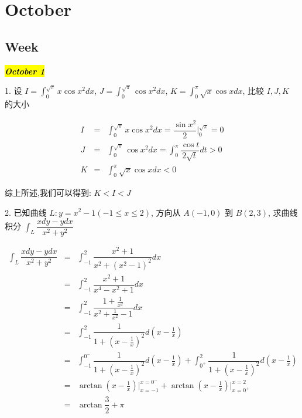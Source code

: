 \chapter{October}
\section{Week }
\hl{\textbf{\textit{October 1}}}

1. 设 $\displaystyle{I=\int_{0}^{\sqrt{\pi}}x\cos x^2dx}$,
$\displaystyle{J=\int_{0}^{\sqrt{\pi}}\cos x^2dx}$,
$\displaystyle{K=\int_{0}^{\pi}\sqrt{x}\cos xdx}$, 比较 $I,J,K$ 的大小
\begin{solution}

	\begin{eqnarray*}
		I & = & \int_{0}^{\sqrt{\pi}}x\cos x^2dx=\dfrac{\sin x^2}{2}|_{0}^{\sqrt{\pi}}=0 \\
		J & = & \int_{0}^{\sqrt{\pi}}\cos x^2dx=\int_{0}^{\pi}\dfrac{\cos t}{2\sqrt{t}}dt>0 \\
	    K & = & \int_{0}^{\pi}\sqrt{x}\cos xdx<0
	\end{eqnarray*}

	综上所述,我们可以得到: $ K < I < J$
\end{solution}

2. 已知曲线 $L: y=x^2-1(-1\leq x\leq 2)$, 方向从 $A(-1,0)$ 到 $B(2,3)$,
求曲线积分 $\displaystyle{\int_{L}\dfrac{xdy-ydx}{x^2+y^2}}$
\begin{solution}

	\begin{eqnarray*}
		\int_{L}\dfrac{xdy-ydx}{x^2+y^2}
		& = & \int_{-1}^{2}\dfrac{x^2+1}{x^2+(x^2-1)^2}dx\\
		& = & \int_{-1}^{2}\dfrac{x^2+1}{x^4-x^2+1}dx\\
		& = & \int_{-1}^{2}\dfrac{1+\frac{1}{x^2}}{x^2+\frac{1}{x^2}-1}dx\\
		& = & \int_{-1}^{2}\dfrac{1}{1+(x-\frac{1}{x})^2}d(x-\frac{1}{x})\\
		& = & \int_{-1}^{0^{-}}\dfrac{1}{1+(x-\frac{1}{x})^2}d(x-\frac{1}{x})+\int_{0^{+}}^{2}\dfrac{1}{1+(x-\frac{1}{x})^2}d(x-\frac{1}{x})\\
		& = & \arctan(x-\frac{1}{x})\big|_{x=-1}^{x=0^{-}}+\arctan(x-\frac{1}{x})\big|_{x=0^{+}}^{x=2}\\
		& = & \arctan\dfrac{3}{2}+\pi
	\end{eqnarray*}
\end{solution}

